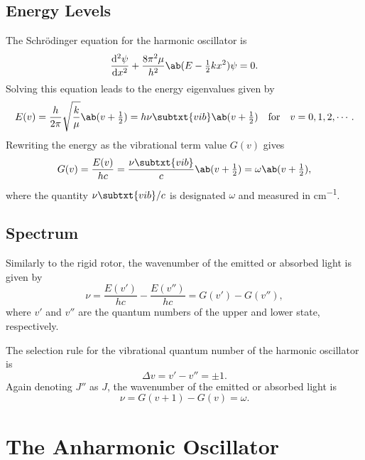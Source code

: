 \subsection{Energy Levels}

The Schr\"odinger equation for the harmonic oscillator is
\begin{equation*}
    \odv[2]{\psi}{x} + \frac{8\pi^2\mu}{h^2}\ab(E - \tfrac{1}{2}kx^2)\psi = 0.
\end{equation*}
Solving this equation leads to the energy eigenvalues given by
\begin{equation*}
    E(v) = \frac{h}{2\pi}\sqrt{\frac{k}{\mu}}\ab(v + \tfrac{1}{2}) = h\nu\subtxt{vib}\ab(v + \tfrac{1}{2}) \quad\text{for}\quad v = 0, 1, 2, \dotsb.
\end{equation*}
Rewriting the energy as the vibrational term value $G(v)$ gives
\begin{equation*}
    G(v) = \frac{E(v)}{hc} = \frac{\nu\subtxt{vib}}{c}\ab(v + \tfrac{1}{2}) = \omega\ab(v + \tfrac{1}{2}),
\end{equation*}
where the quantity $\nu\subtxt{vib}/c$ is designated $\omega$ and measured in \unit{cm^{-1}}.

\subsection{Spectrum}

Similarly to the rigid rotor, the wavenumber of the emitted or absorbed light is given by
\begin{equation*}
    \nu = \frac{E(v')}{hc} - \frac{E(v'')}{hc} = G(v') - G(v''),
\end{equation*}
where $v'$ and $v''$ are the quantum numbers of the upper and lower state, respectively.

The selection rule for the vibrational quantum number of the harmonic oscillator is
\begin{equation*}
    \Delta{}v = v' - v'' = \pm 1.
\end{equation*}
Again denoting $J''$ as $J$, the wavenumber of the emitted or absorbed light is
\begin{equation*}
    \nu = G(v + 1) - G(v) = \omega.
\end{equation*}

\section{The Anharmonic Oscillator}
\label{s:the_anharmonic_oscillator}

